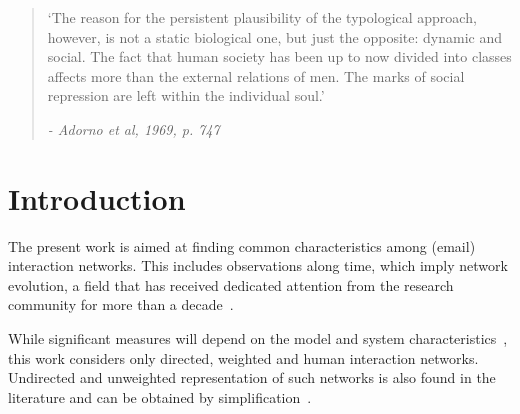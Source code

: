 \documentclass[%
 aip,
 jmp,%
 amsmath,amssymb,
 reprint,%
]{revtex4-1}
\begin{document}
\maketitle


\begin{quotation}
`The reason for the persistent plausibility of the typological approach, however, is not a static biological one, but just the opposite: dynamic and social. The fact that human society has been up to now divided into classes affects more than the external relations of men. The marks of social repression are left within the individual soul.' 

\emph{- Adorno et al, 1969, p. 747}
\end{quotation}


\section{\label{sec:into}Introduction}
The present work is aimed at finding common characteristics among (email) interaction networks. This includes observations along time, which imply network evolution, a field that has received dedicated attention from the research community
for more than a decade~\cite{barabasiEvo,newmanEvolving}.

While significant measures will depend on the model and system characteristics~\cite{newmanStru, newmanWeight},
this work considers only directed, weighted and human interaction networks. Undirected and unweighted representation of such networks is also found in the literature and can be obtained by simplification~\cite{GMANE2}.
\end{document}
